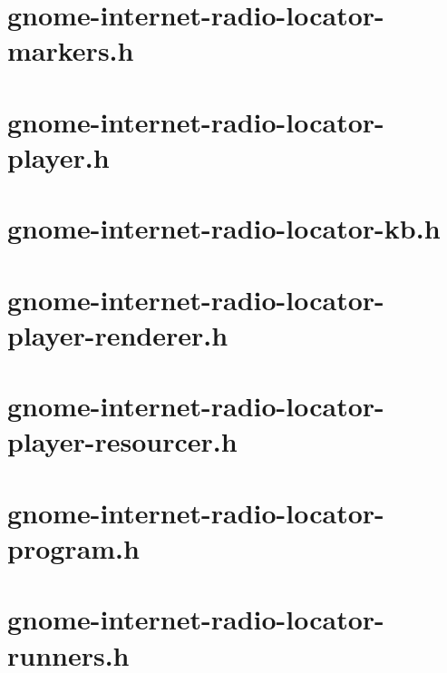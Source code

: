 \documentclass[a4paper,norsk,utf8]{report}
\begin{document}
\section{gnome-internet-radio-locator-markers.h}



\section{gnome-internet-radio-locator-player.h}



\section{gnome-internet-radio-locator-kb.h}



\section{gnome-internet-radio-locator-player-renderer.h}



\section{gnome-internet-radio-locator-player-resourcer.h}



\section{gnome-internet-radio-locator-program.h}



\section{gnome-internet-radio-locator-runners.h}
\end{document}
